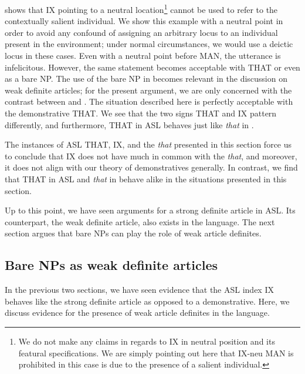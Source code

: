 \documentclass[output=paper,
modfonts
]{langscibook}
\begin{document}
 shows that IX pointing to a neutral location\footnote{We do not make any claims in regards to IX in neutral position and its featural specifications. We are simply pointing out here that IX-neu MAN is prohibited in this case is due to the presence of a salient individual.} cannot be used to refer to the contextually salient individual. We show this example with a neutral point in order to avoid any confound of assigning an arbitrary locus to an individual present in the environment; under normal circumstances, we would use a deictic locus in these cases. Even with a neutral point before MAN, the utterance is infelicitous. However, the same statement becomes acceptable with THAT or even as a bare NP. The use of the bare NP in  becomes relevant in the discussion on weak definite articles; for the present argument, we are only concerned with the contrast between  and . The situation described here is perfectly acceptable with the demonstrative THAT. We see that the two signs THAT and IX pattern differently, and furthermore, THAT in ASL behaves just like \textit{that} in .   

The instances of ASL THAT, IX, and the  \textit{that} presented in this section force us to conclude that IX does not have much in common with the  \textit{that}, and moreover, it does not align with our theory of demonstratives generally. In contrast, we find that THAT in ASL and \textit{that} in  behave alike in the situations presented in this section.

Up to this point, we have seen arguments for a strong definite article in ASL. Its counterpart, the weak definite article, also exists in the language. The next section argues that bare NPs can play the role of weak article definites. 

\subsection{Bare NPs as weak definite articles}

In the previous two sections, we have seen evidence that the ASL index IX behaves like the strong definite article as opposed to a demonstrative. Here, we discuss evidence for the presence of weak article definites in the language. 
\end{document}
